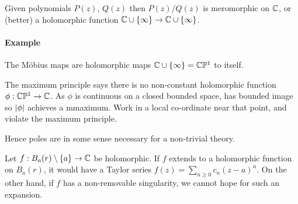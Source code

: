Given polynomials $P(z)$, $Q(z)$ then $P(z)/Q(z)$ is meromorphic on $\mathbb{C}$, or (better) a holomorphic function $\mathbb{C} \cup \{ \infty \} \rightarrow \mathbb{C} \cup \{ \infty \}$.

\paragraph{Example}

The Möbius maps are holomorphic maps $\mathbb{C} \cup \{ \infty \} = \mathbb{C}\mathbb{P}^1$ to itself.

\begin{remark}
  The maximum principle says there is no non-constant holomorphic function $\phi : \mathbb{C}\mathbb{P}^1 \rightarrow \mathbb{C}$.
As $\phi$ is continuous on a closed bounded space, has bounded image so $\lvert\phi\rvert$ achieves a mmaximum. Work in a local co-ordinate near that point, and violate the maximum principle.

Hence poles are in some sense necessary for a non-trivial theory.
\end{remark}

Let $f : B_a(r) \setminus \{ a \} \rightarrow \mathbb{C}$ be holomorphic. If $f$ extends to a holomorphic function on $B_a(r)$, it would have a Taylor series $f(z) = \sum_{n \geq 0} c_n(z - a)^n$.
On the other hand, if $f$ has a non-removable singularity, we cannot hope for such an expansion.

